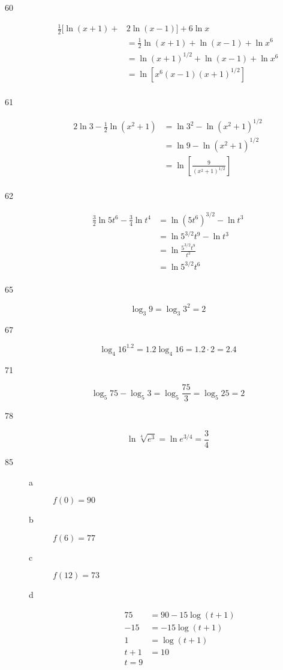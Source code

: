 \documentclass[fleqn,addpoints]{exam}
\begin{document}
\begin{description}
\item[60]
\begin{align*}
  \frac{1}{2} [ \ln(x+1) + & 2 \ln (x-1) ] + 6 \ln x \\
  &= \frac{1}{2} \ln(x+1) + \ln(x-1) + \ln x^6 \\
  &= \ln(x+1)^{1/2} + \ln(x-1) + \ln x^6 \\
  &= \ln \left[ x^6(x-1)(x+1)^{1/2} \right] \\
\end{align*}

\item[61]
\begin{align*}
  2 \ln 3 - \frac{1}{2} \ln(x^2 + 1) &= \ln 3^2 - \ln (x^2+1)^{1/2} \\
  &= \ln 9 - \ln (x^2+1)^{1/2} \\
  &= \ln \left[ \frac{9}{(x^2+1)^{1/2}} \right] \\
\end{align*}

\item[62]
\begin{align*}
  \frac{3}{2} \ln 5t^6 - \frac{3}{4} \ln t^4 &= \ln (5t^6)^{3/2} - \ln t^3 \\
  &= \ln 5^{3/2}t^9 - \ln t^3 \\
  &= \ln \frac{5^{3/2}t^9}{t^3} \\
  &= \ln 5^{3/2}t^6 \\
\end{align*}

\item[65]
\[ \log_3 9 = \log_3 3^2 = 2\]

\item[67]
\[
  \log_4 16^{1.2} = 1.2 \log_4 16 = 1.2 \cdot 2 = 2.4
\]

\item[71]
\[
  \log_5 75 - \log_5 3 = \log_5 \frac{75}{3} = \log_5 25 = 2
\]

\item[78]
\[
  \ln \sqrt[4]{e^3} = \ln e^{3/4} = \frac{3}{4}
\]

\item[85]
\begin{description}

\item[a] $f(0) = 90$

\item[b] $f(6) = 77$

\item[c] $f(12) = 73$

\item[d]
\begin{align*}
  75 &= 90 - 15 \log(t+1) \\
  -15 &= -15 \log(t+1) \\
  1 &= \log(t+1) \\
  t+1 &= 10 \\
  t = 9 \\
\end{align*}


\end{description}
\end{description}
\end{document}

